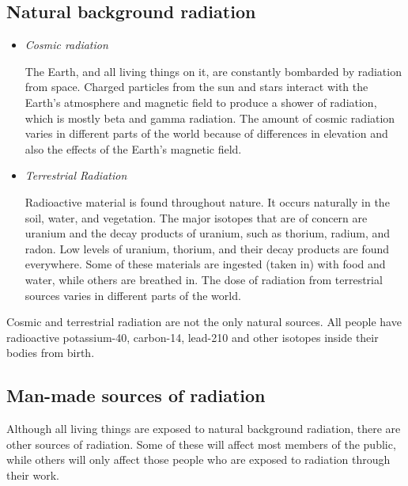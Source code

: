 \subsection{Natural background radiation}
	\begin{itemize}
	\item{\textit{Cosmic radiation}

The Earth, and all living things on it, are constantly bombarded by radiation from space. Charged particles from the sun and stars interact with the Earth's atmosphere and magnetic field to produce a shower of radiation, which is mostly beta and gamma radiation. The amount of cosmic radiation varies in different parts of the world because of differences in elevation and also the effects of the Earth's magnetic field. 
}
	\item{\textit{Terrestrial Radiation}

Radioactive material is found throughout nature. It occurs naturally in the soil, water, and vegetation. The major isotopes that are of concern are uranium and the decay products of uranium, such as thorium, radium, and radon. Low levels of uranium, thorium, and their decay products are found everywhere. Some of these materials are ingested (taken in) with food and water, while others are breathed in. The dose of radiation from terrestrial sources varies in different parts of the world. 
}
	\end{itemize}

 
\begin{IFact}{
Cosmic and terrestrial radiation are not the only natural sources. All people have radioactive potassium-40, carbon-14, lead-210 and other isotopes inside their bodies from birth. 
}
\end{IFact}

\subsection{Man-made sources of radiation}

Although all living things are exposed to natural background radiation, there are other sources of radiation. Some of these will affect most members of the public, while others will only affect those people who are exposed to radiation through their work.

